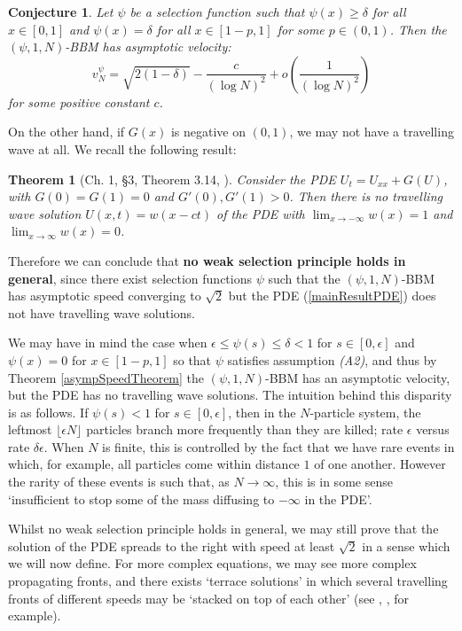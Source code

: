 \documentclass{article}
\newtheorem*{theorem*}{Theorem}
\newtheorem{conj}[theorem]{Conjecture}
\begin{document}
\vspace{1em}

\begin{conj}
    Let $\psi$ be a selection function such that $\psi(x)\geq \delta$ for all $x\in [0,1]$ and $\psi(x)=\delta$ for all $x\in [1-p,1]$ for some $p \in (0,1)$. Then the $(\psi,1,N)$-BBM has asymptotic velocity:
    $$v^\psi_N=\sqrt{2(1-\delta)}-\frac{c}{(\log N)^2} + o\left(\frac{1}{(\log N)^2}\right)$$
    for some positive constant $c$.
\end{conj}

On the other hand, if $G(x)$ is negative on $(0,1)$, we may not have a travelling wave at all. We recall the following result:

\vspace{1em}

\begin{theorem*}[Ch. 1, \S 3, Theorem 3.14, \cite{vvv}]
    Consider the PDE $U_t = U_{xx} + G(U)$, with $G(0)=G(1)=0$ and $G'(0),G'(1)>0$. Then there is no travelling wave solution $U(x,t)=w(x-ct)$ of the PDE with $\lim_{x\to-\infty}w(x)=1$ and $\lim_{x\to\infty}w(x)=0$. 
\end{theorem*}

Therefore we can conclude that \textbf{no weak selection principle holds in general}, since there exist selection functions $\psi$ such that the $(\psi,1,N)$-BBM has asymptotic speed converging to $\sqrt{2}$ but the PDE (\ref{mainResultPDE}) does not have travelling wave solutions. 

We may have in mind the case when $\epsilon \leq \psi(s) \leq \delta < 1$ for $s\in [0,\epsilon]$ and $\psi(x)=0$ for $x\in [1-p,1]$ so that $\psi$ satisfies assumption \textit{(A2)}, and thus by Theorem \ref{asympSpeedTheorem} the $(\psi,1,N)$-BBM has an asymptotic velocity, but the PDE has no travelling wave solutions. The intuition behind this disparity is as follows. If $\psi(s)<1$ for $s\in [0,\epsilon]$, then in the $N$-particle system, the leftmost $\lfloor \epsilon N\rfloor$ particles branch more frequently than they are killed; rate $\epsilon$ versus rate $\delta \epsilon$. When $N$ is finite, this is controlled by the fact that we have rare events in which, for example, all particles come within distance $1$ of one another. However the rarity of these events is such that, as $N\to\infty$, this is in some sense `insufficient to stop some of the mass diffusing to $-\infty$ in the PDE'.

Whilst no weak selection principle holds in general, we may still prove that the solution of the PDE spreads to the right with speed at least $\sqrt{2}$ in a sense which we will now define. For more complex equations, we may see more complex propagating fronts, and there exists `terrace solutions' in which several travelling fronts of different speeds may be `stacked on top of each other' (see \cite{ducrotTerrace}, \cite{gilettiTerraces}, for example).
\end{document}
